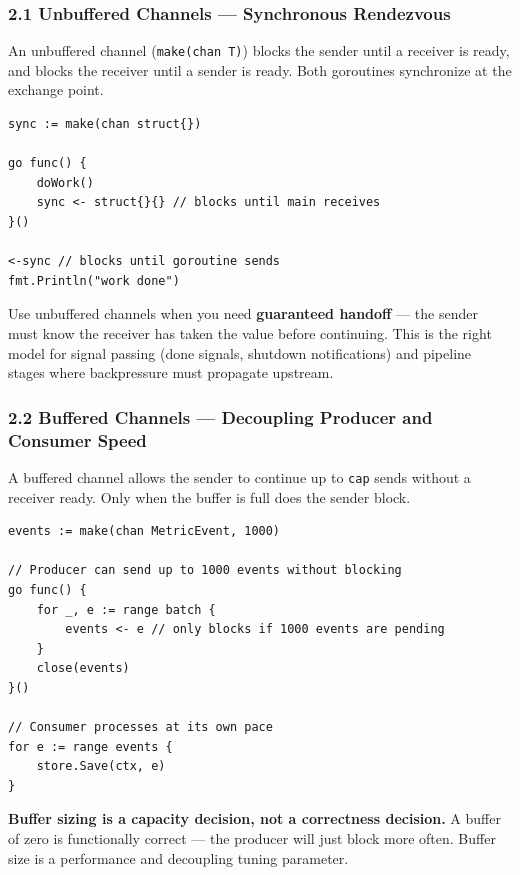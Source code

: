 \documentclass[11pt,a4paper,oneside]{book}
\begin{document}
\subsubsection{2.1 Unbuffered Channels --- Synchronous
Rendezvous}

An unbuffered channel (\texttt{make(chan\ T)}) blocks the sender until a
receiver is ready, and blocks the receiver until a sender is ready. Both
goroutines synchronize at the exchange point.

\begin{verbatim}
sync := make(chan struct{})

go func() {
    doWork()
    sync <- struct{}{} // blocks until main receives
}()

<-sync // blocks until goroutine sends
fmt.Println("work done")
\end{verbatim}

Use unbuffered channels when you need \textbf{guaranteed handoff} ---
the sender must know the receiver has taken the value before continuing.
This is the right model for signal passing (done signals, shutdown
notifications) and pipeline stages where backpressure must propagate
upstream.

\subsubsection{2.2 Buffered Channels --- Decoupling Producer and
Consumer
Speed}

A buffered channel allows the sender to continue up to \texttt{cap}
sends without a receiver ready. Only when the buffer is full does the
sender block.

\begin{verbatim}
events := make(chan MetricEvent, 1000)

// Producer can send up to 1000 events without blocking
go func() {
    for _, e := range batch {
        events <- e // only blocks if 1000 events are pending
    }
    close(events)
}()

// Consumer processes at its own pace
for e := range events {
    store.Save(ctx, e)
}
\end{verbatim}

\textbf{Buffer sizing is a capacity decision, not a correctness
decision.} A buffer of zero is functionally correct --- the producer
will just block more often. Buffer size is a performance and decoupling
tuning parameter.
\end{document}
